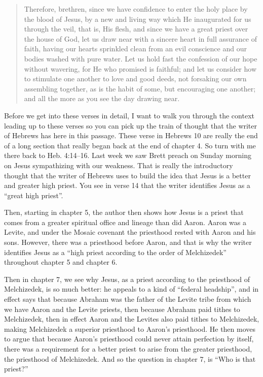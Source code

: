 \documentclass[letterpaper, 12pt]{article}
\begin{document}
    \begin{quote}

        Therefore, brethren, since we have confidence to enter the holy
        place by the blood of Jesus, by a new and living way which He
        inaugurated for us through the veil, that is, His flesh, and
        since we have a great priest over the house of God, let us draw
        near with a sincere heart in full assurance of faith, having our
        hearts sprinkled clean from an evil conscience and our bodies
        washed with pure water. Let us hold fast the confession of our
        hope without wavering, for He who promised is faithful; and let
        us consider how to stimulate one another to love and good deeds,
        not forsaking our own assembling together, as is the habit of
        some, but encouraging one another; and all the more as you see
        the day drawing near.

    \end{quote}

    Before we get into these verses in detail, I want to walk you
    through the context leading up to these verses so you can pick up
    the train of thought that the writer of Hebrews has here in this
    passage. These verse in Hebrews 10 are really the end of a long
    section that really began back at the end of chapter 4. So turn with
    me there back to Heb. 4:14--16. Last week we saw Brett preach on
    Sunday morning on Jesus sympathizing with our weakness. That is
    really the introductory thought that the writer of Hebrews uses to
    build the idea that Jesus is a better and greater high priest. You
    see in verse 14 that the writer identifies Jesus as a ``great high
    priest''.  

    Then, starting in chapter 5, the author then shows how Jesus is a
    priest that comes from a greater spiritual office and lineage than
    did Aaron. Aaron was a Levite, and under the Mosaic covenant the
    priesthood rested with Aaron and his sons. However, there was a
    priesthood before Aaron, and that is why the writer identifies Jesus
    as a ``high priest according to the order of Melchizedek''
    throughout chapter 5 and chapter 6.

    Then in chapter 7, we see why Jesus, as a priest according to the
    priesthood of Melchizedek, is so much better: he appeals to a kind
    of ``federal headship'', and in effect says that because Abraham was
    the father of the Levite tribe from which we have Aaron and the
    Levite priests, then because Abraham paid tithes to Melchizedek,
    then in effect Aaron and the Levites also paid tithes to
    Melchizedek, making Melchizedek a superior priesthood to Aaron's
    priesthood. He then moves to argue that because Aaron's priesthood could never
    attain perfection by itself, there was a requirement for a better
    priest to arise from the greater priesthood, the priesthood of
    Melchizedek. And so the question in chapter 7, is ``Who is that
    priest?''
\end{document}
